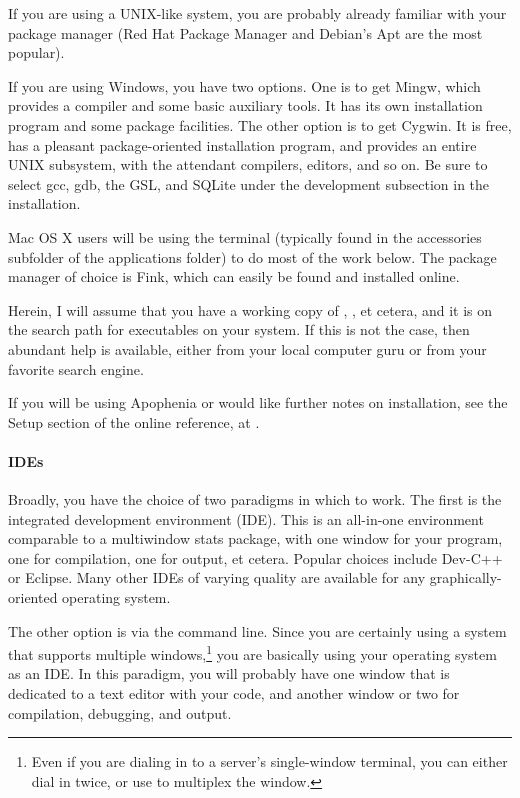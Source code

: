 If you are using a UNIX-like system, you are probably already familiar
with your package manager (Red Hat Package Manager and Debian's Apt are
the most popular).

If you are using Windows, you have two options. One is to get
Mingw, which provides a compiler and some basic auxiliary tools. It has its
own installation program and some package facilities. The other option is to
get Cygwin.  It is free, has a pleasant package-oriented installation
program, and provides an entire UNIX subsystem, with the attendant
compilers, editors, and so on. Be sure to select gcc, gdb, the GSL,
and SQLite under the development subsection in the installation.

Mac OS X users will be using the terminal (typically found in the
accessories subfolder of the applications folder) to do
most of the work below. The package manager of choice is Fink, which
can easily be found and installed online.

Herein, I will assume that you have a working copy of ,
, et cetera, and it is on the search path for executables
on your system. If this is not the case, then abundant help is available,
either from your local computer guru or from your favorite search engine.

If you will be using Apophenia or would like further notes on
installation, see the Setup section of the online reference, at
\onlinereflocation.

\paragraph{IDEs}  
Broadly, you have the choice of two paradigms in which to work. The
first is the integrated development environment (IDE). This is an
all-in-one environment comparable to a multiwindow stats package, with
one window for your program, one for compilation, one for output, et
cetera.  
Popular choices include Dev-C++ or Eclipse. Many other IDEs of varying
quality are available for any graphically-oriented operating system.

The other option is via the command line. Since you are certainly using
a system that supports multiple windows,\footnote{Even if you are
dialing in to a server's single-window terminal, you can either dial in
twice, or use  to multiplex the window.} 
you are basically using your operating system as an IDE.
In this paradigm, you will probably have one window that is dedicated to
a text editor with your code, and another window or two for compilation,
debugging, and output.



